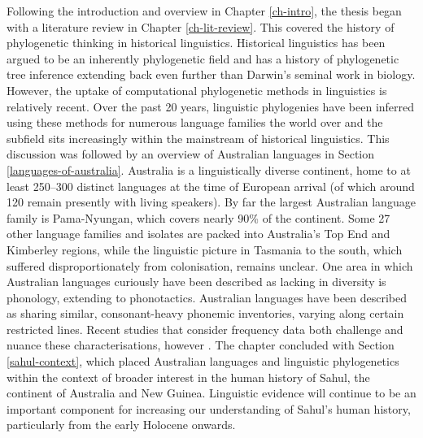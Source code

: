 Following the introduction and overview in Chapter \ref{ch-intro}, the thesis began with a literature review in Chapter \ref{ch-lit-review}. This covered the history of phylogenetic thinking in historical linguistics. Historical linguistics has been argued to be an inherently phylogenetic field \autocite{dunn_language_2015} and has a history of phylogenetic tree inference extending back even further than Darwin's seminal work in biology. However, the uptake of computational phylogenetic methods in linguistics is relatively recent. Over the past 20 years, linguistic phylogenies have been inferred using these methods for numerous language families the world over and the subfield sits increasingly within the mainstream of historical linguistics. This discussion was followed by an overview of Australian languages in Section \ref{languages-of-australia}. Australia is a linguistically diverse continent, home to at least 250--300 distinct languages at the time of European arrival (of which around 120 remain presently with living speakers). By far the largest Australian language family is Pama-Nyungan, which covers nearly 90\% of the continent. Some 27 other language families and isolates are packed into Australia's Top End and Kimberley regions, while the linguistic picture in Tasmania to the south, which suffered disproportionately from colonisation, remains unclear. One area in which Australian languages curiously have been described as lacking in diversity is phonology, extending to phonotactics. Australian languages have been described as sharing similar, consonant-heavy phonemic inventories, varying along certain restricted lines. Recent studies that consider frequency data both challenge and nuance these characterisations, however \autocites{gasser_revisiting_2014}{round_phonology_2021}{round_phonotactics_2021}. The chapter concluded with Section \ref{sahul-context}, which placed Australian languages and linguistic phylogenetics within the context of broader interest in the human history of Sahul, the continent of Australia and New Guinea. Linguistic evidence will continue to be an important component for increasing our understanding of Sahul's human history, particularly from the early Holocene onwards.

